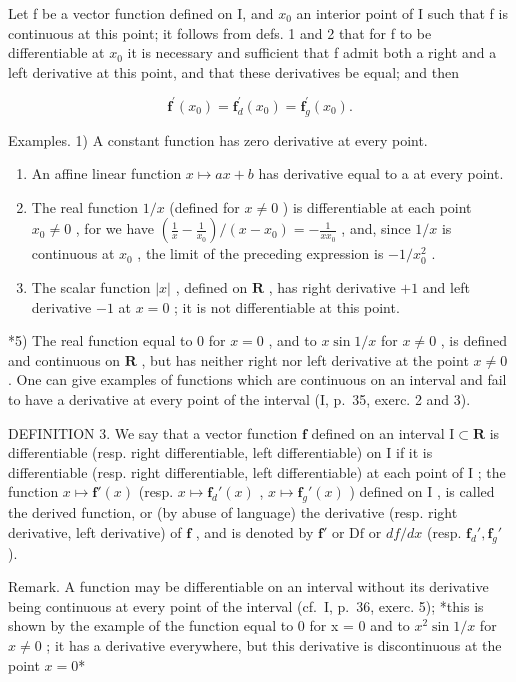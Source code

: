 Let f be a vector function defined on I, and \(x_{0}\) an interior point of I such that f is continuous at this point; it follows from defs. 1 and 2 that for f to be differentiable at \(x_{0}\) it is necessary and sufficient that f admit both a right and a left derivative at this point, and that these derivatives be equal; and then

\[
\mathbf {f} ^ {\prime} (x _ {0}) = \mathbf {f} _ {d} ^ {\prime} (x _ {0}) = \mathbf {f} _ {g} ^ {\prime} (x _ {0}).
\]

Examples. 1) A constant function has zero derivative at every point.

\begin{enumerate}
\def\labelenumi{\arabic{enumi})}
\setcounter{enumi}{1}
\item
  An affine linear function \(x \mapsto ax + b\) has derivative equal to a at every point.
\item
  The real function \(1 / x\) (defined for \(x \neq 0\) ) is differentiable at each point \(x_0 \neq 0\) , for we have \(\left(\frac{1}{x} - \frac{1}{x_0}\right) / (x - x_0) = -\frac{1}{xx_0}\) , and, since \(1 / x\) is continuous at \(x_0\) , the limit of the preceding expression is \(-1 / x_0^2\) .
\item
  The scalar function \(|x|\) , defined on \(\mathbf{R}\) , has right derivative \(+1\) and left derivative \(-1\) at \(x = 0\) ; it is not differentiable at this point.
\end{enumerate}

*5) The real function equal to 0 for \(x = 0\) , and to \(x \sin 1/x\) for \(x \neq 0\) , is defined and continuous on \(\mathbf{R}\) , but has neither right nor left derivative at the point \(x \neq 0\) . One can give examples of functions which are continuous on an interval and fail to have a derivative at every point of the interval (I, p.~35, exerc. 2 and 3).

DEFINITION 3. We say that a vector function \(\mathbf{f}\) defined on an interval \(\mathrm{I} \subset \mathbf{R}\) is differentiable (resp. right differentiable, left differentiable) on \(\mathrm{I}\) if it is differentiable (resp. right differentiable, left differentiable) at each point of \(\mathrm{I}\) ; the function \(x \mapsto \mathbf{f}'(x)\) (resp. \(x \mapsto \mathbf{f}_d'(x)\) , \(x \mapsto \mathbf{f}_g'(x)\) ) defined on \(\mathrm{I}\) , is called the derived function, or (by abuse of language) the derivative (resp. right derivative, left derivative) of \(\mathbf{f}\) , and is denoted by \(\mathbf{f}'\) or \(\mathrm{Df}\) or \(df/dx\) (resp. \(\mathbf{f}_d', \mathbf{f}_g'\) ).

Remark. A function may be differentiable on an interval without its derivative being continuous at every point of the interval (cf.~I, p.~36, exerc. 5); *this is shown by the example of the function equal to 0 for x = 0 and to \(x^{2} \sin 1/x\) for \(x \neq 0\) ; it has a derivative everywhere, but this derivative is discontinuous at the point \(x = 0\)*

